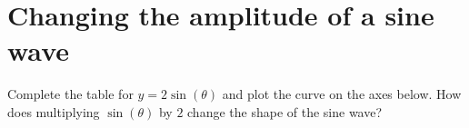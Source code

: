 \documentclass[a4paper,11pt,twoside]{article}
\begin{document}


    

\section{Changing the amplitude of a sine wave}

Complete the table for $y = 2\sin(\theta)$ and plot the curve on the axes below. How does multiplying $\sin(\theta)$ by $2$ change the shape of the sine wave?
\end{document}
